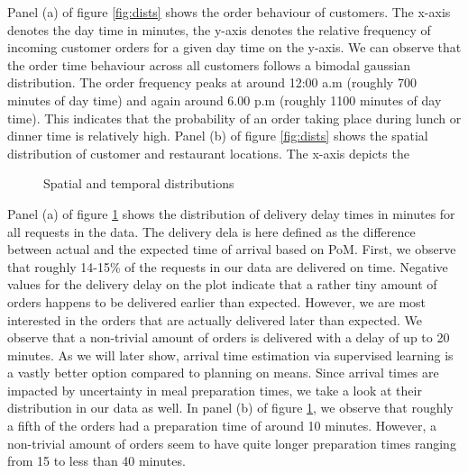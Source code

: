 Panel (a) of figure \ref{fig:dists} shows the order behaviour of customers. The x-axis denotes the day time in minutes, the y-axis denotes the relative frequency of incoming customer orders for a given day time on the y-axis. We can observe that the order time behaviour across all customers follows a bimodal gaussian distribution. The order frequency peaks at around 12:00 a.m (roughly 700 minutes of day time) and again around 6.00 p.m (roughly 1100 minutes of day time). This indicates that the probability of an order taking place during lunch or dinner time is relatively high.  
Panel (b) of figure \ref{fig:dists} shows the spatial distribution of customer and restaurant locations. The x-axis depicts the  

\begin{figure}[h]
	\centering
	\caption{Spatial and temporal distributions}
	\label{fig:prepdelay}
\end{figure}
Panel (a) of figure \ref{fig:prepdelay} shows the distribution of delivery delay times in minutes for all requests in the data. The delivery dela is here defined as the difference between actual and the expected time of arrival based on PoM. First, we observe that roughly 14-15\% of the requests in our data are delivered on time. Negative values for the delivery delay on the plot indicate that a rather tiny amount of orders happens to be delivered earlier than expected. However, we are most interested in the orders that are actually delivered later than expected. We observe that a non-trivial amount of orders is delivered with a delay of up to 20 minutes. As we will later show, arrival time estimation via supervised learning is a vastly better option compared to planning on means.
Since arrival times are impacted by uncertainty in meal preparation times, we take a look at their distribution in our data as well. In panel (b) of figure \ref{fig:prepdelay}, we observe that roughly a fifth of the orders had a preparation time of around 10 minutes. However, a non-trivial amount of orders seem to have quite longer preparation times ranging from 15 to less than 40 minutes. 

